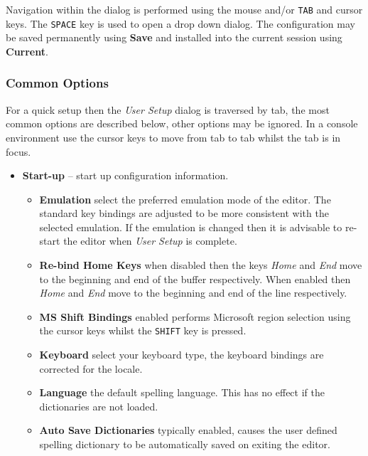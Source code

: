 \documentclass[11pt,a4paper,pdftex]{article}
\begin{document}
  Navigation within the dialog is performed using the mouse and/or
  \texttt{TAB} and cursor keys. The \texttt{SPACE} key is used to open a drop
  down dialog. The configuration may be saved permanently using \textbf{Save}
  and installed into the current session using \textbf{Current}.

\subsubsection{Common Options}

  For a quick setup then the \textit{User Setup} dialog is traversed by tab,
  the most common options are described below, other options may be ignored. 
  In a console environment use the cursor keys to move from tab to tab whilst 
  the tab is in focus.

  \begin{itemize}
    \item \textbf{Start-up} -- start up configuration information.

    \begin{itemize}

      \item \textbf{Emulation} select the preferred emulation mode of the
      editor. The standard key bindings are adjusted to be more consistent
      with the selected emulation. If the emulation is changed then it is
      advisable to re-start the editor when \textit{User Setup} is complete. 

      \item \textbf{Re-bind Home Keys} when disabled then the keys
      \textit{Home} and \textit{End} move to the beginning and end of the
      buffer respectively. When enabled then \textit{Home} and \textit{End}
      move to the beginning and end of the line respectively.

      \item \textbf{MS Shift Bindings} enabled performs Microsoft region
      selection using the cursor keys whilst the \texttt{SHIFT} key is
      pressed.

      \item \textbf{Keyboard} select your keyboard type, the keyboard bindings
      are corrected for the locale.

      \item \textbf{Language} the default spelling language. This has no
      effect if the dictionaries are not loaded.

      \item \textbf{Auto Save Dictionaries} typically enabled, causes the user
      defined spelling dictionary to be automatically saved on exiting the
      editor.


\end{itemize}
\end{itemize}
\end{document}
